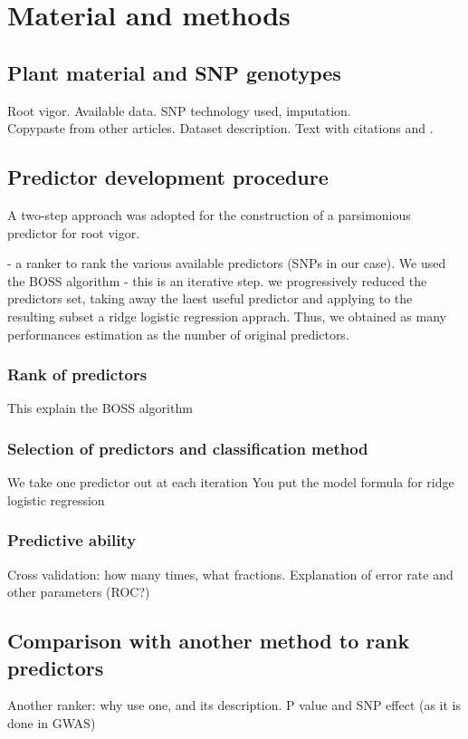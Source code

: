 \section{Material and methods}
\label{sec:1}
\subsection{Plant material and SNP genotypes}
\label{sec:data}
Root vigor. Available data. SNP technology used, imputation. \\
Copypaste from other articles. Dataset description.
Text with citations \cite{stevanato2013high} and
\cite{saccomani2009molecular}.

\subsection{Predictor development procedure}
\label{sec:overview}
A two-step approach was adopted for the construction of a parsimonious
predictor for root vigor.

- a ranker to rank the various available predictors (SNPs in our case). We
  used the BOSS algorithm
- this is an iterative step. we progressively reduced the predictors set, 
  taking away the laest useful predictor and applying to the resulting
  subset a ridge logistic regression apprach. Thus, we obtained as many
  performances estimation as the number of original predictors.
\subsubsection{Rank of predictors}
\label{par:boss}
This explain the BOSS algorithm \cite{russu2012stochastic}

\subsubsection{Selection of predictors and classification method}
\label{par:predictor_selection}
We take one predictor out at each iteration
You put the model formula for ridge logistic regression

\subsubsection{Predictive ability}
\label{par:estimating_error}
Cross validation: how many times, what fractions. 
Explanation of error rate and other parameters (ROC?)

\subsection{Comparison with another method to rank predictors}
\label{sec:other_ranker}
Another ranker: why use one, and its description.
P value and SNP effect (as it is done in GWAS)

